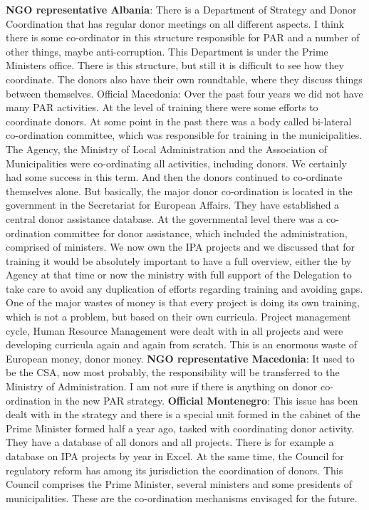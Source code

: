 \textbf{NGO representative Albania}: There is a Department of Strategy and Donor Coordination that has regular donor meetings on all different aspects. I think there is some co-ordinator in this structure responsible for PAR and a number of other things, maybe anti-corruption. This Department is under the Prime Ministers office. There is this structure, but still it is difficult to see how they coordinate. The donors also have their own roundtable, where they discuss things between themselves.  
Official Macedonia: Over the past four years we did not have many PAR activities. At the level of training there were some efforts to coordinate donors. At some point in the past there was a body called bi-lateral co-ordination committee, which was responsible for training in the municipalities. The Agency, the Ministry of Local Administration and the Association of Municipalities were co-ordinating all activities, including donors. We certainly had some success in this term. And then the donors continued to co-ordinate themselves alone. But basically, the major donor co-ordination is located in the government in the Secretariat for European Affairs. They have established a central donor assistance database. At the governmental level there was a co-ordination committee for donor assistance, which included the administration, comprised of ministers. We now own the IPA projects and we discussed that for training it would be absolutely important to have a full overview,  either the by Agency at that time or now the ministry with full support of the Delegation to take care to avoid any duplication of efforts regarding training and avoiding gaps. One of the major wastes of money is that every project is doing its own training, which is not a problem, but based on their own curricula. Project management cycle, Human Resource Management were dealt with in all projects and were developing curricula again and again from scratch. This is an enormous waste of European money, donor money.
\textbf{NGO representative Macedonia}: It used to be the CSA, now most probably, the responsibility will be transferred to the Ministry of Administration. I am not sure if there is anything on donor co-ordination in the new PAR strategy.
\textbf{Official Montenegro}: This issue has been dealt with in the strategy and there is a special unit formed in the cabinet of the Prime Minister formed half a year ago, tasked with coordinating donor activity. They have a database of all donors and all projects. There is for example a database on IPA projects by year in Excel. At the same time, the Council for regulatory reform has among its jurisdiction the coordination of donors. This Council comprises the Prime Minister, several ministers and some presidents of municipalities. These are the co-ordination mechanisms envisaged for the future. 
